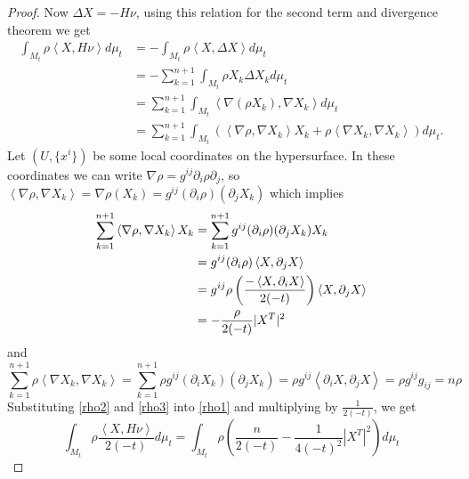 \begin{proof}
Now $ \Delta X = - H \nu $, using this relation for the second term and divergence theorem we get 
\begin{align}
\int_{M_{t}}\rho \left< X,H \nu \right> d \mu_{t} & =  -\int_{M_{t}} \rho\left< X,\Delta X \right> d \mu_{t} \nonumber \\ 
& = - \sum_{k=1}^{n+1}\int_{M_{t}} \rho X_{k} \Delta X_{k} d \mu_{t}\nonumber \\
& = \sum_{k=1}^{n+1} \int_{M_{t}} \left< \nabla(\rho X_{k}), \nabla X_{k} \right>d \mu_{t}\nonumber \\ 
& = \sum_{k=1}^{n+1} \int_{M_{t}} \left( \left< \nabla\rho, \nabla X_{k} \right>X_{k} + \rho \left< \nabla X_{k}, \nabla X_{k} \right> \right)d \mu_{t}. \label{rho1}
\end{align}
Let $ (U,\{x^{i}\}) $ be some local coordinates on the hypersurface. In these coordinates we can write $ \nabla \rho = g^{ij} \partial_{i} \rho \partial_{j} $, so $  \left< \nabla \rho , \nabla X_{k}\right> = \nabla \rho (X_{k}) = g^{ij} (\partial_{i}\rho) (\partial_{j}X_{k}) $ which implies 
\begin{align}
\sum_{k=1}^{n+1} \left< \nabla \rho , \nabla X_{k}  \right> X_{k} & = \sum_{k=1}^{n+1}  g^{ij} (\partial_{i}\rho) (\partial_{j}X_{k}) X_{k}\nonumber \\ 
& = g^{ij}( \partial_i \rho) \left< X, \partial_j X \right>\nonumber \\
& = g^{ij} \rho \left( \frac{-\left< X, \partial_{i}X \right>}{2(-t)} \right) \left< X, \partial_j X \right>\nonumber \\
& = - \frac{\rho}{2(-t)}|X^T|^2 \label{rho2}
\end{align}
and 
\begin{equation}
\sum_{k=1}^{n+1} \rho  \left< \nabla X_{k}, \nabla X_{k} \right> = \sum_{k=1}^{n+1} \rho g^{ij} (\partial_{i} X_{k} )(\partial_{j}X_{k}) = \rho g^{ij} \left<  \partial_{i}X, \partial_{j}X \right> = \rho g^{ij}g_{ij} = n \rho \label{rho3}
\end{equation}
Substituting \cref{rho2} and \cref{rho3} into \cref{rho1} and multiplying by $ \frac{1}{2(-t)} $, we get 
\begin{equation*}
\int_{M_{t}}\rho  \frac{\left< X,H \nu \right>}{2(-t)} d \mu_{t}  = \int_{M_{t}} \rho \left( \frac{n}{2(-t)} - \frac{1}{4(-t)^2}|X^T|^2  \right) d \mu_{t} 
\end{equation*}

\end{proof}
